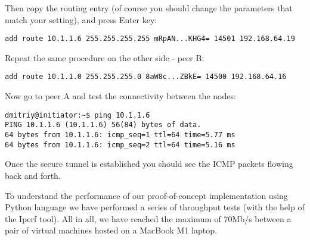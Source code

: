 Then copy the routing entry (of course you should change the parameters that match your setting),
and press Enter key:

\begin{small}
\begin{verbatim}
add route 10.1.1.6 255.255.255.255 mRpAN...KHG4= 14501 192.168.64.19
\end{verbatim}
\end{small}

Repeat the same procedure on the other side - peer B:

\begin{small}
\begin{verbatim}
add route 10.1.1.0 255.255.255.0 8aW8c...ZBkE= 14500 192.168.64.16
\end{verbatim}
\end{small}

Now go to peer A and test the connectivity between the nodes:
\begin{verbatim}
dmitriy@initiator:~$ ping 10.1.1.6
PING 10.1.1.6 (10.1.1.6) 56(84) bytes of data.
64 bytes from 10.1.1.6: icmp_seq=1 ttl=64 time=5.77 ms
64 bytes from 10.1.1.6: icmp_seq=2 ttl=64 time=5.16 ms
\end{verbatim}

Once the secure tunnel is established you should see the ICMP packets flowing back and forth.

To understand the performance of our proof-of-concept implementation using Python language we 
have performed a series of throughput tests (with the help of the Iperf tool). All in all, 
we have reached the maximum of 70Mb/s between a pair of virtual machines hosted on a MacBook 
M1 laptop.

